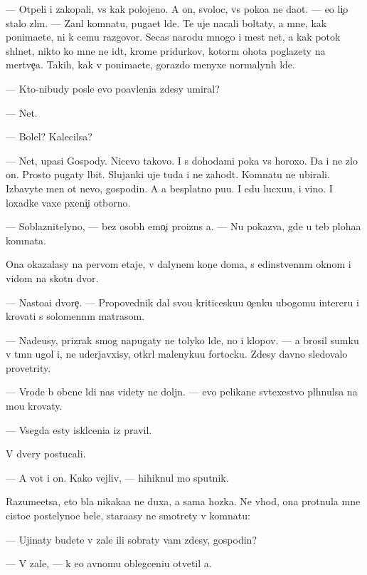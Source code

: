 \documentclass[10pt]{book}
\begin{document}
— Otpeli i zakopali, vs{\e} kak polojeno. A on, svoloc, vs{\e} poko{\y}a ne da{\y}ot. — {\Y}e{\y}o li{\c}o stalo zl{\yi}m. — Zan{\ia}l komnatu, puga{\y}et l{\iu}de{\y}. Te uje nacali boltaty, a mne, kak ponima{\y}ete, ni k cemu razgovor{\yi}. Se{\y}cas narodu mnogo i mest net, a kak potok shl{\yi}net, nikto ko mne ne id{\e}t, krome pridurkov, kotor{\yi}m ohota poglazety na mertve{\c}a. Takih, kak v{\yi} ponima{\y}ete, gorazdo menyxe normalyn{\yi}h l{\iu}de{\y}.

— Kto-nibudy posle {\y}evo po{\y}avleni{\y}a zdesy umiral?

— Net.

— Bolel? Kalecilsa?

— Net, upasi Gospody. Nicevo takovo. I s dohodami poka vs{\e} horoxo. Da i ne zlo{\y} on. Prosto pugaty l{\iu}bit. Slujanki uje tuda i ne zahod{\ia}t. Komnatu ne ubirali. Izbavyte men{\ia} ot nevo, gospodin. A {\y}a besplatno pu{\x}u. I {\y}edu lucxu{\y}u, i vino. I loxadke vaxe{\y} pxeni{\c}i otborno{\y}.

— Soblaznitelyno, — bez osob{\yi}h emo{\c}i{\y} proizn{\e}s {\y}a. — Nu pokaz{\yi}va{\y}, gde u teb{\ia} ploha{\y}a komnata.

Ona okazalasy na pervom etaje, v dalynem kon{\c}e doma, s {\y}edinstvenn{\yi}m oknom i vidom na skotn{\yi}{\y} dvor.

— Nasto{\y}a{\x}i{\y} dvore{\c}. — Propovednik dal svo{\y}u kriticesku{\y}u o{\c}enku ubogomu inter{\y}eru i krovati s solomenn{\yi}m matrasom.

— Nade{\y}usy, prizrak smog napugaty ne tolyko l{\iu}de{\y}, no i klopov. — {\Y}a brosil sumku v t{\e}mn{\yi}{\y} ugol i, ne uderjavxisy, otkr{\yi}l malenyku{\y}u fortocku. Zdesy davno sledovalo provetrity.

— Vrode b{\yi} ob{\yi}cn{\yi}{\y}e l{\iu}di nas videty ne doljn{\yi}. — {\Y}evo pelikan{\y}e sv{\ia}te{\y}xestvo pl{\iu}hnulsa na mo{\y}u krovaty.

— Vsegda {\y}esty iskl{\iu}ceni{\y}a iz pravil.

V dvery postucali.

— A vot i on. Kako{\y} vejliv{\yi}{\y}, — hihiknul mo{\y} sputnik.

Razume{\y}etsa, eto b{\yi}la nikaka{\y}a ne duxa, a sama hoz{\ia}{\y}ka. Ne vhod{\ia}, ona prot{\ia}nula mne cisto{\y}e postelyno{\y}e bel{\y}e, stara{\y}asy ne smotrety v komnatu:

— Ujinaty budete v zale ili sobraty vam zdesy, gospodin?

— V zale, — k {\y}e{\y}o {\y}avnomu oblegceni{\y}u otvetil {\y}a.
\end{document}
